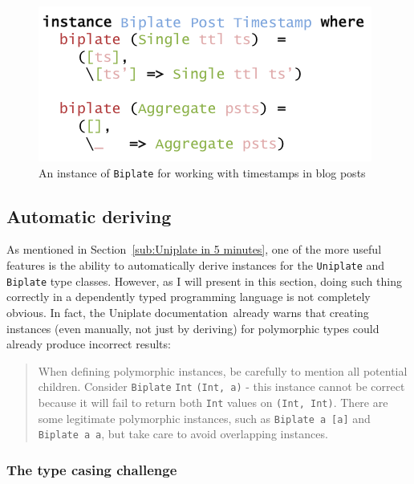 \documentclass{ituthesis}
\newcommand{\tttype}[1]{\textcolor{type-color}{\texttt{#1}}}
\newcommand{\ttvar}[1]{\textcolor{local-var-color}{\texttt{#1}}}
\theoremstyle{break}
\begin{document}
\begin{figure}[ht]
\begin{center}
    \includegraphics[scale=0.5]{Figures/UniplateInstance.png}
\end{center}
\caption{An instance of \tttype{Biplate} for working with timestamps in blog posts}
\label{fig:uniplatexmpinst}
\end{figure}



\subsection{Automatic deriving}
\label{sub:Automatic deriving}
As mentioned in Section~\ref{sub:Uniplate in 5 minutes}, one of the more useful features is the ability to automatically derive instances for the \tttype{Uniplate} and \tttype{Biplate} type classes.
However, as I will present in this section, doing such thing correctly in a dependently typed programming language is not completely obvious.
In fact, the Uniplate documentation\,\autocite{mitchell2014uniplate} already warns that creating instances (even manually, not just by deriving) for polymorphic types could already produce
incorrect results:

\blockquote{
When defining polymorphic instances, be carefully to mention all potential children.
Consider \tttype{Biplate} \tttype{Int} \tttype{(Int,}~\ttvar{a}\tttype{)} - this instance cannot be correct because it will fail to return both \tttype{Int} values on \tttype{(Int, Int)}.
There are some legitimate polymorphic instances, such as \tttype{Biplate}~\ttvar{a}~\tttype{[}\ttvar{a}\tttype{]} and \tttype{Biplate}~\ttvar{a}~\ttvar{a}, but take care to avoid overlapping instances.}

\subsubsection{The type casing challenge}
\label{ssub:The type casing challenge}
\end{document}
